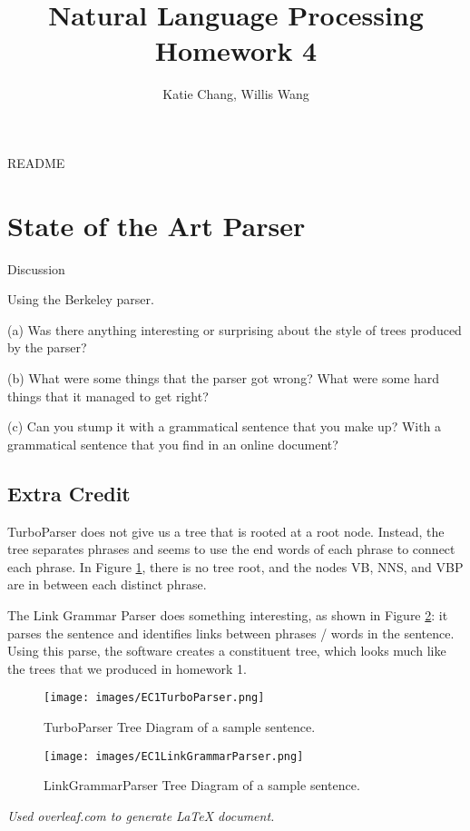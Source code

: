 \documentclass[12pt, letterpaper]{article}
\title{Natural Language Processing Homework 4}
\author{Katie Chang, Willis Wang}
\begin{document}
\maketitle

README

\section{State of the Art Parser}
Discussion

Using the Berkeley parser.

(a) Was there anything interesting or surprising about the style of trees produced by the parser?

(b) What were some things that the parser got wrong? What were some hard things that it managed to get right?

(c) Can you stump it with a grammatical sentence that you make up? With a grammatical sentence that you find in an online document?

\subsection{Extra Credit}
TurboParser does not give us a tree that is rooted at a root node. Instead, the tree separates phrases and seems to use the end words of each phrase to connect each phrase. In Figure \ref{turboParser}, there is no tree root, and the nodes VB, NNS, and VBP are in between each distinct phrase. 

The Link Grammar Parser does something interesting, as shown in Figure \ref{lgParser}: it parses the sentence and identifies links between phrases / words in the sentence. Using this parse, the software creates a constituent tree, which looks much like the trees that we produced in homework 1.

\begin{figure}
\begin{center}
\texttt{[image: images/EC1TurboParser.png]}
\end{center}
\caption{TurboParser Tree Diagram of a sample sentence.}
\label{turboParser}
\end{figure}

\begin{figure}
\begin{center}
\texttt{[image: images/EC1LinkGrammarParser.png]}
\end{center}
\caption{LinkGrammarParser Tree Diagram of a sample sentence.}
\label{lgParser}
\end{figure}

\begin{center}
\textit{Used overleaf.com to generate LaTeX document.}
\end{center}
\end{document}
